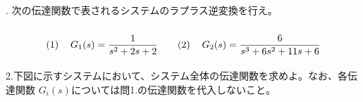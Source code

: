 \documentclass[a4paper,12pt]{article}
\begin{document}
\noindent
{}

\vspace{10mm}

. 次の伝達関数で表されるシステムのラプラス逆変換を行え。
\vspace{-4mm}
\[
\renewcommand{\arraystretch}{3.0} %
\begin{tabular}{@{}rl@{\quad\quad}rl@{}}
(1) & $G_1(s) = \dfrac{1}{s^2+2s+2}$                 & (2) & $G_2(s) = \dfrac{6}{s^3+6s^2+11s+6}$ \\
\end{tabular}
\]

\noindent
2.下図に示すシステムにおいて、システム全体の伝達関数を求めよ。なお、各伝達関数
\(G_i(s)\)については問1.の伝達関数を代入しないこと。
\vspace{2mm}
\end{document}
